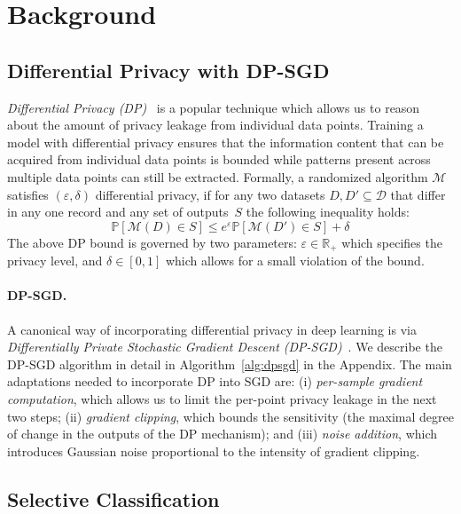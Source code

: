 \section{Background}
\label{sec:background}

\subsection{Differential Privacy with DP-SGD}
\label{sec:def_dp}

\emph{Differential Privacy (DP)}~\citep{dwork2014algorithmic} is a popular technique which allows us to reason about the amount of privacy leakage from individual data points. Training a model with differential privacy ensures that the information content that can be acquired from individual data points is bounded while patterns present across multiple data points can still be extracted. Formally, a randomized algorithm $\mathcal{M}$ satisfies $(\varepsilon, \delta)$ differential privacy, if for any two datasets $D, D'\subseteq \mathcal{D}$ that differ in any one record and any set of outputs~$S$ the following inequality holds:
\begin{equation}
\label{eq:dp}
    \mathbb{P}\left[\mathcal{M}(D) \in S\right] \leq e^\varepsilon  \mathbb{P}\left[\mathcal{M}(D') \in S\right] + \delta
\end{equation}
The above DP bound is governed by two parameters: $\varepsilon \in \mathbb{R}_+$ which specifies the privacy level, and $\delta \in [0, 1]$ which allows for a small violation of the bound.

\paragraph{DP-SGD.} A canonical way of incorporating differential privacy in deep learning is via \emph{Differentially Private Stochastic Gradient Descent (DP-SGD)}~\citep{bassily2014private,abadi2016deep}. We describe the DP-SGD algorithm in detail in Algorithm~\ref{alg:dpsgd} in the Appendix. The main adaptations needed to incorporate DP into SGD are: (i) \emph{per-sample gradient computation}, which allows us to limit the per-point privacy leakage in the next two steps; (ii) \emph{gradient clipping}, which bounds the sensitivity (\ie the maximal degree of change in the outputs of the DP mechanism); and (iii) \emph{noise addition}, which introduces Gaussian noise proportional to the intensity of gradient clipping.

\subsection{Selective Classification}

